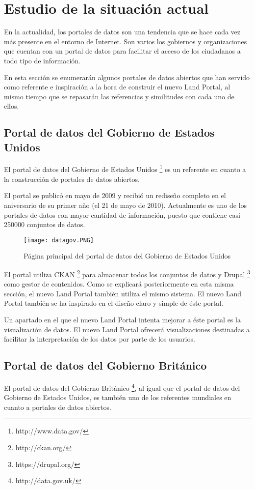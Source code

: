 {\section{Estudio de la situación actual}
En la actualidad, los portales de datos son una tendencia que se hace cada vez más presente en el entorno de Internet.  Son varios los gobiernos y organizaciones que cuentan con un portal de datos para facilitar el acceso de los ciudadanos a todo tipo de información.

En esta sección se enumerarán algunos portales de datos abiertos que han servido como referente e inspiración a la hora de construir el nuevo Land Portal, al mismo tiempo que se repasarán las referencias y similitudes con cada uno de ellos.

\subsection{Portal de datos del Gobierno de Estados Unidos}
El portal de datos del Gobierno de Estados Unidos \footnote{http://www.data.gov/} es un referente en cuanto a la construcción de portales de datos abiertos.

El portal se publicó en mayo de 2009 y recibió un rediseño completo en el aniversario de su primer año (el 21 de mayo de 2010).  Actualmente es uno de los portales de datos con mayor cantidad de información, puesto que contiene casi 250000 conjuntos de datos.
\begin{figure}[h]
\centering
\texttt{[image: datagov.PNG]}
\caption{Página principal del portal de datos del Gobierno de Estados Unidos}
\end{figure}

El portal utiliza CKAN \footnote{http://ckan.org/} para almacenar todos los conjuntos de datos y Drupal \footnote{https://drupal.org/} como gestor de contenidos.  Como se explicará posteriormente en esta misma sección, el nuevo Land Portal también utiliza el mismo sistema.  El nuevo Land Portal también se ha inspirado en el diseño claro y simple de éste portal.

Un apartado en el que el nuevo Land Portal intenta mejorar a éste portal es la visualización de datos. El nuevo Land Portal ofrecerá visualizaciones destinadas a facilitar la interpretación de los datos por parte de los usuarios.

\subsection{Portal de datos del Gobierno Británico}
El portal de datos del Gobierno Británico \footnote{http://data.gov.uk/}, al igual que el portal de datos del Gobierno de Estados Unidos, es también uno de los referentes mundiales en cuanto a portales de datos abiertos.

}
